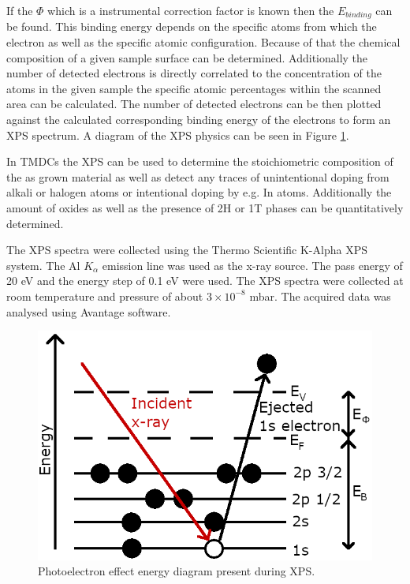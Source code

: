 If the $\Phi$ which is a instrumental correction factor is known then the $E_{binding}$ can be found. This binding energy depends on the specific atoms from which the electron as well as the specific atomic configuration. Because of that the chemical composition of a given sample surface can be determined. Additionally the number of detected electrons is directly correlated to the concentration of the atoms in the given sample the specific atomic percentages within the scanned area can be calculated. The number of detected electrons can be then plotted against the calculated corresponding binding energy of the electrons to form an XPS spectrum. A diagram of the XPS physics can be seen in Figure \ref{fig:MethodologyXPSSetup}.

In TMDCs the XPS can be used to determine the stoichiometric composition of the as grown material as well as detect any traces of unintentional doping from alkali or halogen atoms or intentional doping by e.g. In atoms. Additionally the amount of oxides as well as the presence of 2H or 1T phases can be quantitatively determined. 

The XPS spectra were collected using the Thermo Scientific K-Alpha XPS system. The Al $K_{\alpha}$ emission line was used as the x-ray source. The pass energy of 20 eV and the energy step of 0.1 eV were used. The XPS spectra were collected at room temperature and pressure of about $3 \times 10^{-8}$ mbar. The acquired data was analysed using Avantage software.

\begin{figure}[!ht]
	\begin{center}
		\includegraphics[scale=0.4]{Methodology/XPSSetup.png}
		\caption{Photoelectron effect energy diagram present during XPS.}
		\label{fig:MethodologyXPSSetup}
	\end{center}
\end{figure}

